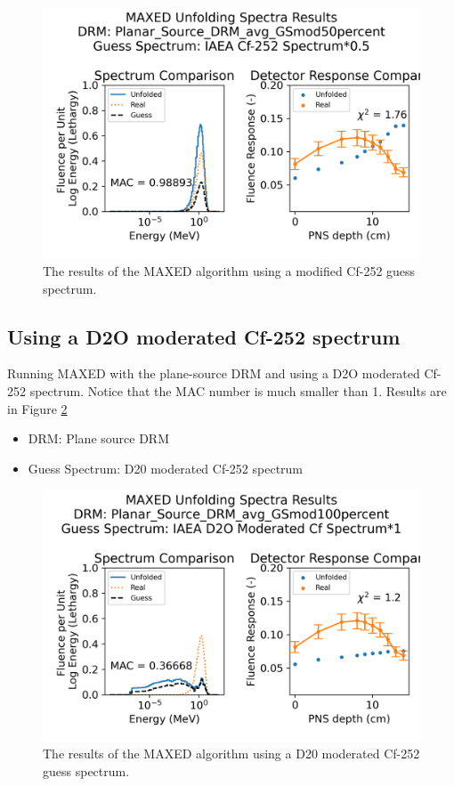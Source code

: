 \begin{figure}[htb]
  \centering
  \includegraphics[scale=0.8]{images/Planar_Source_DRM_avg_GSmod50percent_IAEA Cf-252 Spectrum_0.png}
  \caption{The results of the MAXED algorithm using a modified Cf-252 guess spectrum.} \label{MAXED_result_planeDRM_gs50Cf}
\end{figure}

\subsection*{Using a D2O moderated Cf-252 spectrum}
Running MAXED with the plane-source DRM and using a D2O moderated Cf-252 spectrum. Notice that the MAC number is much smaller than 1. Results are in Figure \ref{MAXED_result_planeDRM_gs100D2OmodCf}
\begin{itemize}
\item DRM: Plane source DRM
\item Guess Spectrum: D20 moderated Cf-252 spectrum
\end{itemize}

\begin{figure}[htb]
  \centering
  \includegraphics[scale=0.8]{images/Planar_Source_DRM_avg_GSmod100percent_IAEA D2O Moderated Cf Spectrum_0.png}
  \caption{The results of the MAXED algorithm using a D20 moderated Cf-252 guess spectrum.} \label{MAXED_result_planeDRM_gs100D2OmodCf}
\end{figure}

